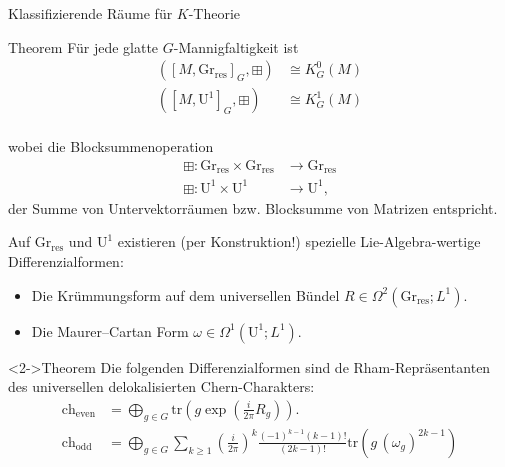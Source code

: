 \documentclass[12pt,utf8,notheorems,compress,t]{beamer}
\renewcommand{\_}{\mathpunct{.}}
\newcommand{\?}{\,{:}\,}
\newcommand{\tr}{\mathrm{tr}}
\newcommand{\ch}{\mathrm{ch}}
\newcommand{\grres}{\mathrm{Gr}_{\mathrm{res}}}
\begin{document}
\begin{frame}{Klassifizierende Räume für $K$-Theorie}
    \begin{block}{Theorem}
        Für jede glatte $G$-Mannigfaltigkeit ist 
        \begin{align*}
            ([M, \mathrm{Gr}_{\mathrm{res}}]_G,\boxplus) &\cong K_G^0(M) \\
            ([M, \mathrm{U}^1]_G,\boxplus) &\cong K_G^1(M) \\
        \end{align*}
    \end{block}
    wobei die Blocksummenoperation
    \begin{align*}
        \boxplus\colon \grres \times \grres &\to \grres \\\boxplus\colon
        \mathrm U^1 \times \mathrm
        U^1 &\to \mathrm U^1,
    \end{align*}
    der Summe von Untervektorräumen bzw. Blocksumme von Matrizen entspricht.
\end{frame}
\begin{frame}
    Auf $\grres$ und $\mathrm U^1$ existieren (per Konstruktion!) spezielle
    Lie-Algebra-wertige Differenzialformen:
    \begin{itemize}
        \item Die Krümmungsform auf dem universellen Bündel $R\in
            \Omega^2(\mathrm{Gr}_{\mathrm{res}}; L^1)$.
        \item Die Maurer--Cartan Form $\omega\in \Omega^1(\mathrm U^1;
            L^1)$.
    \end{itemize}
    \begin{block}<2->{Theorem}
        Die folgenden Differenzialformen sind de Rham-Repräsentanten des
        universellen delokalisierten Chern-Charakters:
        \begin{align*}
            \ch_{\mathrm{even}} &= \bigoplus_{g\in G} \tr \left( g \exp\left(
            \frac{i}{2\pi}R_g \right) \right). \\
            \ch_{\mathrm{odd}} &= \bigoplus_{g\in G} \sum_{k\geq 1}
            \left(\frac{i}{2\pi}\right)^{k}
            \frac{(-1)^{k-1}(k-1)!}{(2k-1)!}\tr \left(g\,
            (\omega_g)^{2k-1}\right)
        \end{align*}
    \end{block}
\end{frame}
\end{document}
